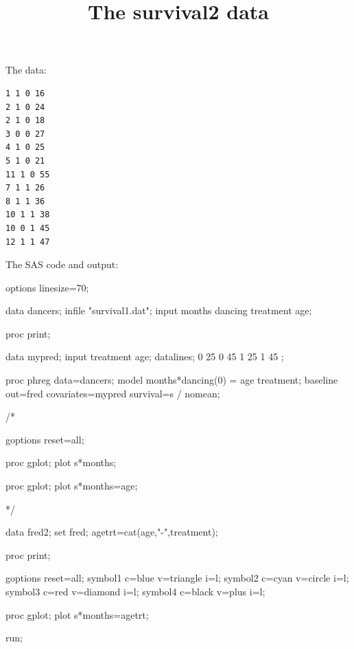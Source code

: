 \documentclass{article}
\title{The survival2 data}
\begin{document}
\maketitle
The data:
\begin{verbatim}
1 1 0 16 
2 1 0 24 
2 1 0 18 
3 0 0 27 
4 1 0 25 
5 1 0 21 
11 1 0 55 
7 1 1 26 
8 1 1 36 
10 1 1 38 
10 0 1 45 
12 1 1 47 
\end{verbatim}
The SAS code and output:
\begin{Winput}
options linesize=70;

data dancers;
  infile "survival1.dat";
  input months dancing treatment age;

proc print;
 
data mypred;
  input treatment age;
  datalines;
  0 25 
  0 45 
  1 25 
  1 45 
;

proc phreg data=dancers;
  model months*dancing(0) = age treatment;
  baseline out=fred covariates=mypred survival=s / nomean;

/*

goptions reset=all;
  
proc gplot;
  plot s*months;

proc gplot;
    plot s*months=age;

*/

data fred2;
  set fred;
  agetrt=cat(age,"-",treatment);  
  
proc print;

goptions reset=all;
symbol1 c=blue v=triangle i=l;
symbol2 c=cyan v=circle i=l;
symbol3 c=red v=diamond i=l;
symbol4 c=black v=plus i=l;

proc gplot;
  plot s*months=agetrt;  

run;

\end{Winput}
\end{document}
